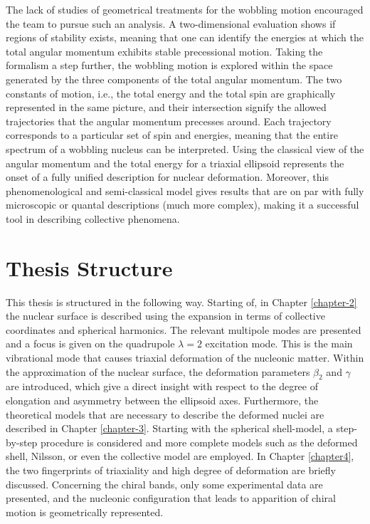 The lack of studies of geometrical treatments for the wobbling motion encouraged the team to pursue such an analysis. A two-dimensional evaluation shows if regions of stability exists, meaning that one can identify the energies at which the total angular momentum exhibits stable precessional motion. Taking the formalism a step further, the wobbling motion is explored within the space generated by the three components of the total angular momentum. The two constants of motion, i.e., the total energy and the total spin are graphically represented in the same picture, and their intersection signify the allowed trajectories that the angular momentum precesses around. Each trajectory corresponds to a particular set of spin and energies, meaning that the entire spectrum of a wobbling nucleus can be interpreted. Using the classical view of the angular momentum and the total energy for a triaxial ellipsoid represents the onset of a fully unified description for nuclear deformation. Moreover, this phenomenological and semi-classical model gives results that are on par with fully microscopic or quantal descriptions (much more complex), making it a successful tool in describing collective phenomena.

\section*{Thesis Structure}

This thesis is structured in the following way. Starting of, in Chapter \ref{chapter-2} the nuclear surface is described using the expansion in terms of collective coordinates and spherical harmonics. The relevant multipole modes are presented and a focus is given on the quadrupole $\lambda=2$ excitation mode. This is the main vibrational mode that causes triaxial deformation of the nucleonic matter. Within the approximation of the nuclear surface, the deformation parameters $\beta_2$ and $\gamma$ are introduced, which give a direct insight with respect to the degree of elongation and asymmetry between the ellipsoid axes. Furthermore, the theoretical models that are necessary to describe the deformed nuclei are described in Chapter \ref{chapter-3}. Starting with the spherical shell-model, a step-by-step procedure is considered and more complete models such as the deformed shell, Nilsson, or even the collective model are employed. In Chapter \ref{chapter4}, the two fingerprints of triaxiality and high degree of deformation are briefly discussed. Concerning the chiral bands, only some experimental data are presented, and the nucleonic configuration that leads to apparition of chiral motion is geometrically represented. 

